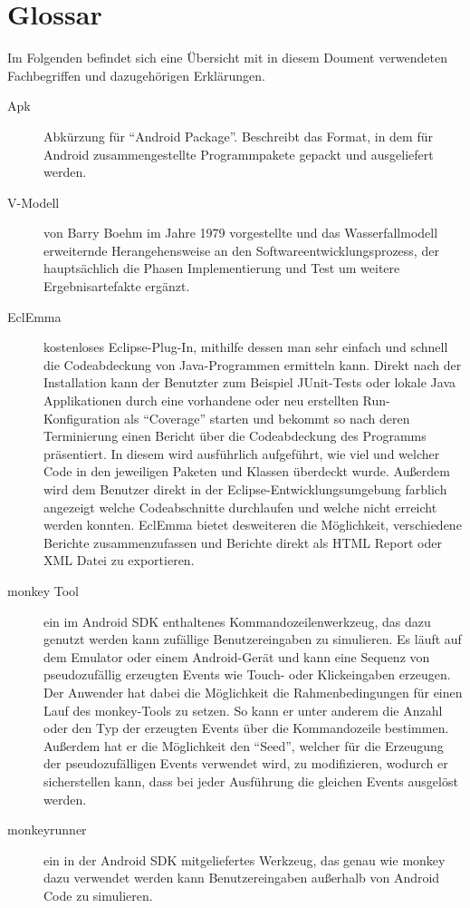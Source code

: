 \chapter{Glossar}
Im Folgenden befindet sich eine Übersicht mit in diesem Doument verwendeten Fachbegriffen und dazugehörigen Erklärungen.
\begin{description}
	\item[Apk] Abkürzung für "`Android Package"'. Beschreibt das Format, in dem für Android zusammengestellte Programmpakete gepackt und ausgeliefert werden.
	\item[V-Modell] von Barry Boehm im Jahre 1979 vorgestellte und das Wasserfallmodell erweiternde Herangehensweise an den Softwareentwicklungsprozess, der hauptsächlich die Phasen Implementierung und Test um weitere Ergebnisartefakte ergänzt.
	\item[EclEmma] kostenloses Eclipse-Plug-In, mithilfe dessen man sehr einfach und schnell die Codeabdeckung von Java-Programmen ermitteln kann.
		Direkt nach der Installation kann der Benutzter zum Beispiel JUnit-Tests oder lokale Java Applikationen durch eine vorhandene oder neu erstellten Run-Konfiguration als "`Coverage"' starten und bekommt so nach deren Terminierung einen Bericht über die Codeabdeckung des Programms präsentiert.
		In diesem wird ausführlich aufgeführt, wie viel und welcher Code in den jeweiligen Paketen und Klassen überdeckt wurde. 
		Außerdem wird dem Benutzer direkt in der Eclipse-Entwicklungsumgebung farblich angezeigt welche Codeabschnitte durchlaufen und welche nicht erreicht werden konnten.
		EclEmma bietet desweiteren die Möglichkeit, verschiedene Berichte zusammenzufassen und Berichte direkt als HTML Report oder XML Datei zu exportieren.
	\item[monkey Tool] ein im Android SDK enthaltenes Kommandozeilenwerkzeug, das dazu genutzt werden kann zufällige Benutzereingaben zu simulieren.
		Es läuft auf dem Emulator oder einem Android-Gerät und kann eine Sequenz von pseudozufällig erzeugten Events wie Touch- oder Klickeingaben erzeugen.
		Der Anwender hat dabei die Möglichkeit die Rahmenbedingungen für einen Lauf des monkey-Tools zu setzen.
		So kann er unter anderem die Anzahl oder den Typ der erzeugten Events über die Kommandozeile bestimmen.
		Außerdem hat er die Möglichkeit den "`Seed"', welcher für die Erzeugung der pseudozufälligen Events verwendet wird, zu modifizieren, wodurch er sicherstellen kann, dass bei jeder Ausführung die gleichen Events ausgelöst werden.
	\item[monkeyrunner] ein in der Android SDK mitgeliefertes Werkzeug, das genau wie monkey dazu verwendet werden kann Benutzereingaben außerhalb von Android Code zu simulieren.

\end{description}
